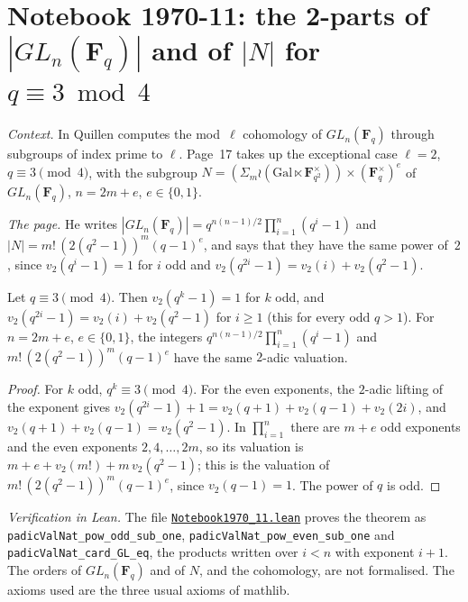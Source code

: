\section[Notebook 1970-11: the 2-parts of $|GL_n(\mathbf F_q)|$ and $|N|$]{Notebook 1970-11: the 2-parts of $|GL_n(\mathbf F_q)|$ and of $|N|$ for $q \equiv 3 \bmod 4$\protect{}}\label{sec:quillen-1970-11}

\emph{Context.} In  Quillen computes the mod~$\ell$ cohomology of $GL_n(\mathbf F_q)$ through subgroups of index prime to $\ell$. Page~17 takes up the exceptional case $\ell = 2$, $q \equiv 3 \pmod 4$, with the subgroup $N = (\Sigma_m \wr (\mathrm{Gal} \ltimes \mathbf F_{q^2}^\times)) \times (\mathbf F_q^\times)^e$ of $GL_n(\mathbf F_q)$, $n = 2m + e$, $e \in \{0, 1\}$.

\emph{The page.} He writes $|GL_n(\mathbf F_q)| = q^{n(n-1)/2}\prod_{i=1}^n (q^i - 1)$ and $|N| = m!\,(2(q^2 - 1))^m (q - 1)^e$, and says that they have the same power of~$2$, since $v_2(q^i - 1) = 1$ for $i$ odd and $v_2(q^{2i} - 1) = v_2(i) + v_2(q^2 - 1)$.

\begin{encadre}
\begin{theoreme}\label{thm:quillen-1970-11}
Let $q \equiv 3 \pmod 4$. Then $v_2(q^k - 1) = 1$ for $k$ odd, and $v_2(q^{2i} - 1) = v_2(i) + v_2(q^2 - 1)$ for $i \ge 1$ (this for every odd $q > 1$). For $n = 2m + e$, $e \in \{0,1\}$, the integers $q^{n(n-1)/2}\prod_{i=1}^n (q^i - 1)$ and $m!\,(2(q^2-1))^m (q-1)^e$ have the same $2$-adic valuation.
\end{theoreme}
\end{encadre}

\begin{proof}
For $k$ odd, $q^k \equiv 3 \pmod 4$. For the even exponents, the $2$-adic lifting of the exponent gives $v_2(q^{2i} - 1) + 1 = v_2(q + 1) + v_2(q - 1) + v_2(2i)$, and $v_2(q+1) + v_2(q-1) = v_2(q^2 - 1)$. In $\prod_{i=1}^{n}$ there are $m + e$ odd exponents and the even exponents $2, 4, \ldots, 2m$, so its valuation is $m + e + v_2(m!) + m\,v_2(q^2 - 1)$; this is the valuation of $m!\,(2(q^2 - 1))^m(q-1)^e$, since $v_2(q - 1) = 1$. The power of $q$ is odd.
\end{proof}

\emph{Verification in Lean.} The file \href{\leanblobmain/Notebook1970_11.lean}{\texttt{Notebook1970\_11.\allowbreak{}lean}} proves the theorem as \texttt{padicValNat\_pow\_odd\_sub\_one}, \texttt{padicValNat\_pow\_even\_sub\_one} and \texttt{padicValNat\_card\_GL\_eq}, the products written over $i < n$ with exponent $i + 1$. The orders of $GL_n(\mathbf F_q)$ and of $N$, and the cohomology, are not formalised. The axioms used are the three usual axioms of mathlib.

